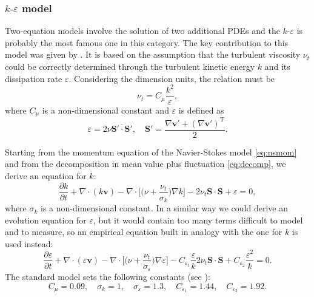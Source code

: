 \subsubsection{$k\text{-}\varepsilon$ model}
Two-equation models involve the solution of two additional PDEs and the 
$k\text{-}\varepsilon$ is probably the most famous one in this category. The 
key contribution to this model was given by \textcite{turbo:ke}. It is 
based on the assumption that the turbulent viscosity $\nu_t$ could be correctly 
determined through the turbulent kinetic energy $k$ and its dissipation rate 
$\varepsilon$. Considering the dimension units, the relation must be
\begin{equation}
\nu_t = C_\mu \frac{k^2}{\varepsilon},
\end{equation}
where $C_\mu$ is a non-dimensional constant and $\varepsilon$ is defined as
\begin{equation}
\varepsilon = 2 \nu \overline{\mathbf{S}' \cdot \mathbf{S}'}, \quad \mathbf{S}' 
= \frac{\nabla \mathbf{v}' + (\nabla \mathbf{v}')^\mathrm{T}}{2}.
\end{equation}

Starting from the momentum equation of the Navier-Stokes model \eqref{eq:nsmom} 
and from the decomposition in mean value plus fluctuation \eqref{eq:decomp}, we 
derive an equation for $k$:
\begin{equation}
	\frac{\partial k}{\partial t} + \nabla \cdot (k\mathbf{v}) - \nabla \cdot
	\bigg[ \bigg(\nu + \frac{\nu_t}{\sigma_k}\bigg) \nabla k\bigg] 
	-2\nu_t \mathbf{S} \cdot \mathbf{S} + \varepsilon = 0,
\end{equation}
where $\sigma_k$ is a non-dimensional constant. In a similar way we could 
derive an evolution equation for $\varepsilon$, but it would contain too many 
terms difficult to model and to measure, so an empirical equation built in 
analogy with the one for $k$ is used instead:
\begin{equation} \label{eq:epsilon}
		\frac{\partial \varepsilon}{\partial t} + \nabla \cdot (\varepsilon 
		\mathbf{v}) - \nabla \cdot \bigg[ \bigg(\nu + 
		\frac{\nu_t}{\sigma_\varepsilon} 
		\bigg) \nabla \varepsilon \bigg] - C_{\varepsilon_1} 
		\frac{\varepsilon}{k} 2 \nu_t \mathbf{S} \cdot \mathbf{S} + 
		C_{\varepsilon_2}\frac{\varepsilon^2}{k} = 0.
\end{equation}
The standard model sets the following constants (see \cite{main:vermal}):
\begin{equation}
	C_\mu = 0.09, \quad \sigma_k = 1, \quad \sigma_\varepsilon = 1.3, \quad 
	C_{\varepsilon_1} = 1.44, \quad C_{\varepsilon_2} = 1.92.
\end{equation}

